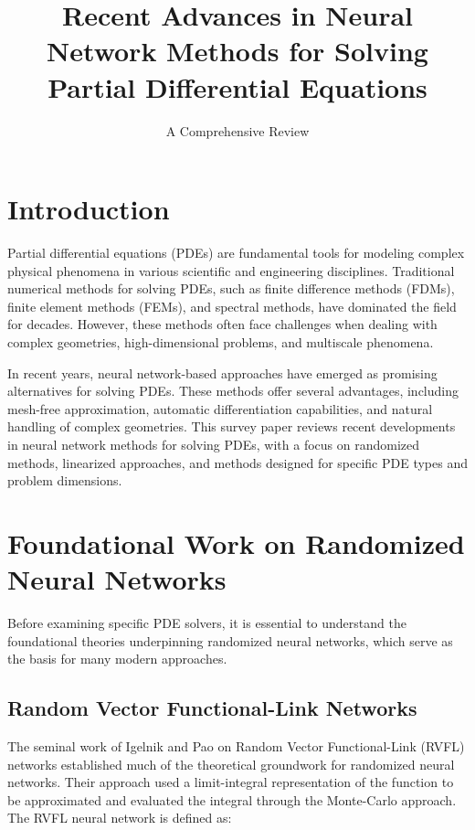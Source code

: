 \documentclass[11pt]{article}
\title{Recent Advances in Neural Network Methods for Solving Partial Differential Equations}
\author{A Comprehensive Review}
\date{}
\begin{document}
\maketitle

\section{Introduction}

Partial differential equations (PDEs) are fundamental tools for modeling complex physical phenomena in various scientific and engineering disciplines. Traditional numerical methods for solving PDEs, such as finite difference methods (FDMs), finite element methods (FEMs), and spectral methods, have dominated the field for decades. However, these methods often face challenges when dealing with complex geometries, high-dimensional problems, and multiscale phenomena.

In recent years, neural network-based approaches have emerged as promising alternatives for solving PDEs. These methods offer several advantages, including mesh-free approximation, automatic differentiation capabilities, and natural handling of complex geometries. This survey paper reviews recent developments in neural network methods for solving PDEs, with a focus on randomized methods, linearized approaches, and methods designed for specific PDE types and problem dimensions.

\section{Foundational Work on Randomized Neural Networks}

Before examining specific PDE solvers, it is essential to understand the foundational theories underpinning randomized neural networks, which serve as the basis for many modern approaches.

\subsection{Random Vector Functional-Link Networks}

The seminal work of Igelnik and Pao \citep{Igelnik1995} on Random Vector Functional-Link (RVFL) networks established much of the theoretical groundwork for randomized neural networks. Their approach used a limit-integral representation of the function to be approximated and evaluated the integral through the Monte-Carlo approach. The RVFL neural network is defined as:
\end{document}
